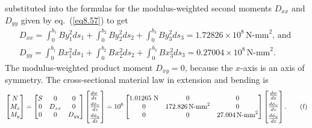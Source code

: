\documentclass{AeroStructure-ERJohnson}
\begin{document}
\begin{example*}
substituted into the formulas for the modulus-weighted second
moments $D_{x x}$ and $D_{y y}$ given by eq.~(\ref{eq8.57}) to get
\begin{gather}
D_{x x}=\int_{0}^{b_{1}} B y_{1}^{2} d s_{1}+\int_{0}^{b_{2}}
B y_{2}^{2} d s_{2}+\int_{0}^{b_{3}} B y_{3}^{2} d s_{3}=1.72826
\times 10^{8}\,\textrm{N-mm}^{2}\mbox{, and }\tag{d}\label{ex8.5d}\\
D_{y
y}=\int_{0}^{b_{1}} B x_{1}^{2} d s_{1}+\int_{0}^{b_{2}} B
x_{2}^{2} d s_{2}+\int_{0}^{b_{3}} B x_{3}^{2} d s_{3}=0.27004
\times 10^{8}\,\textrm{N-mm}^{2}.\tag{e}\label{ex8.5e}
\end{gather}
The
modulus-weighted product moment $D_{x y}=0$, because the $x$-axis
is an axis of symmetry. The cross-sectional material law in
extension and bending is
\begin{align}
\left[\begin{array}{@{}c@{}}N\\
M_{x}\\
M_{y}\end{array}\right]=\left[\begin{array}{@{}ccc@{}}S & 0 & 0\\
0 & D_{x x} & 0\\
0 & 0 & D_{y
y}\end{array}\right]\left[\begin{array}{@{}l@{}}
\frac{d w}{d z}\\
[4pt]
\frac{d \phi_{x}}{d z}\\
[4pt]
\frac{d \phi_{y}}{dz}\end{array}\right]=10^{6}\left[\begin{array}{@{}ccc@{}}1.01265
\mathrm{~N} & 0 & 0\\
0 & 172.826\,\textrm{N-mm}^{2} & 0\\
0 & 0 & 27.004\,\textrm{N-mm}^{2}\end{array}\right]\left[\begin{array}{@{}c@{}}\frac{d
w}{d z}\\[4pt]
\frac{d \phi_{x}}{d z}\\[4pt]
\frac{d \phi_{y}}{d
z}\end{array}\right].\tag{f}\label{ex8.5f}
\end{align}

\vspace*{-1pc}


\end{example*}
\end{document}

